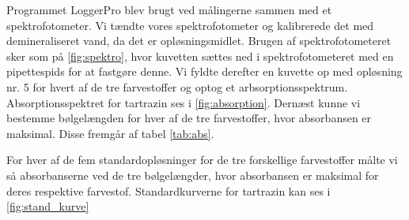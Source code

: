 \documentclass[11pt]{article}
\theoremstyle{definition}
\begin{document}
Programmet LoggerPro blev brugt ved målingerne sammen med et spektrofotometer.
Vi tændte vores spektrofotometer og kalibrerede det med demineraliseret vand, da det er opløsningsmidlet.
Brugen af spektrofotometeret sker som på \cref{fig:spektro}, hvor kuvetten sættes ned i spektrofotometeret med en pipettespids for at fastgøre denne. 
Vi fyldte derefter en kuvette op med opløsning nr. 5 for hvert af de tre farvestoffer og optog et arbsorptionsspektrum.
Absorptionsspektret for tartrazin ses i \cref{fig:absorption}.
Dernæst kunne vi bestemme bølgelængden for hver af de tre farvestoffer, hvor absorbansen er maksimal. 
Disse fremgår af tabel \ref{tab:abs}.

For hver af de fem standardopløsninger for de tre forskellige farvestoffer målte vi så absorbanserne ved de tre bølgelængder, hvor absorbansen er maksimal for deres respektive farvestof.
Standardkurverne for tartrazin kan ses i \cref{fig:stand_kurve}
\end{document}
